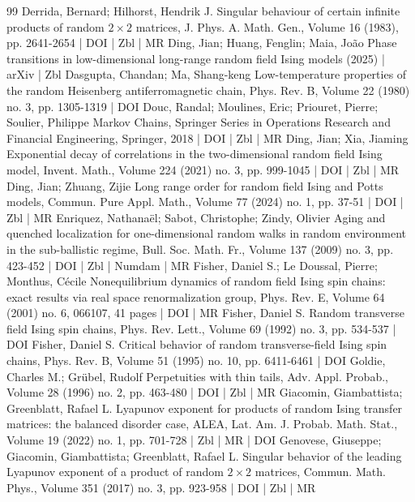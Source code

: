 \documentclass[10pt]{amsart}
\theoremstyle{definition}\newtheorem{defi}[theo]{Definition}\newtheorem{rema}[theo]{Remark}\newtheorem{exam}[theo]{Example}\newtheorem{exem}[theo]{Example}\newtheorem{nota}[theo]{Notation}
\begin{document}
\begin{thebibliography}{99}
 Derrida, Bernard; Hilhorst, Hendrik J. Singular behaviour of certain infinite products of random $2\times 2$ matrices, J. Phys. A. Math. Gen., Volume 16 (1983), pp. 2641-2654 | DOI | Zbl | MR
 Ding, Jian; Huang, Fenglin; Maia, João Phase transitions in low-dimensional long-range random field Ising models (2025) | arXiv | Zbl
 Dasgupta, Chandan; Ma, Shang-keng Low-temperature properties of the random Heisenberg antiferromagnetic chain, Phys. Rev. B, Volume 22 (1980) no. 3, pp. 1305-1319 | DOI
 Douc, Randal; Moulines, Eric; Priouret, Pierre; Soulier, Philippe Markov Chains, Springer Series in Operations Research and Financial Engineering, Springer, 2018 | DOI | Zbl | MR
 Ding, Jian; Xia, Jiaming Exponential decay of correlations in the two-dimensional random field Ising model, Invent. Math., Volume 224 (2021) no. 3, pp. 999-1045 | DOI | Zbl | MR
 Ding, Jian; Zhuang, Zijie Long range order for random field Ising and Potts models, Commun. Pure Appl. Math., Volume 77 (2024) no. 1, pp. 37-51 | DOI | Zbl | MR
 Enriquez, Nathanaël; Sabot, Christophe; Zindy, Olivier Aging and quenched localization for one-dimensional random walks in random environment in the sub-ballistic regime, Bull. Soc. Math. Fr., Volume 137 (2009) no. 3, pp. 423-452 | DOI | Zbl | Numdam | MR
 Fisher, Daniel S.; Le Doussal, Pierre; Monthus, Cécile Nonequilibrium dynamics of random field Ising spin chains: exact results via real space renormalization group, Phys. Rev. E, Volume 64 (2001) no. 6, 066107, 41 pages | DOI | MR
 Fisher, Daniel S. Random transverse field Ising spin chains, Phys. Rev. Lett., Volume 69 (1992) no. 3, pp. 534-537 | DOI
 Fisher, Daniel S. Critical behavior of random transverse-field Ising spin chains, Phys. Rev. B, Volume 51 (1995) no. 10, pp. 6411-6461 | DOI
 Goldie, Charles M.; Grübel, Rudolf Perpetuities with thin tails, Adv. Appl. Probab., Volume 28 (1996) no. 2, pp. 463-480 | DOI | Zbl | MR
 Giacomin, Giambattista; Greenblatt, Rafael L. Lyapunov exponent for products of random Ising transfer matrices: the balanced disorder case, ALEA, Lat. Am. J. Probab. Math. Stat., Volume 19 (2022) no. 1, pp. 701-728 | Zbl | MR | DOI
 Genovese, Giuseppe; Giacomin, Giambattista; Greenblatt, Rafael L. Singular behavior of the leading Lyapunov exponent of a product of random $2 \times 2$ matrices, Commun. Math. Phys., Volume 351 (2017) no. 3, pp. 923-958 | DOI | Zbl | MR

\end{thebibliography}
\end{document}
